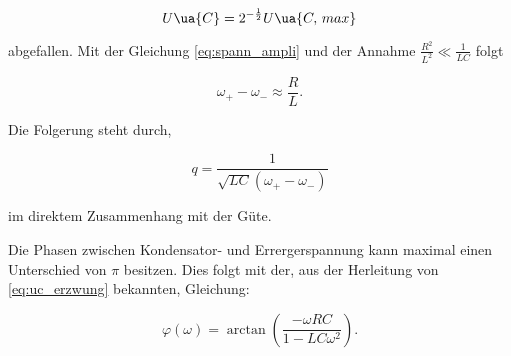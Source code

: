 \begin{equation*}
   U\ua{C}=2^{-\frac{1}{2}} U\ua{C,\, max}
\end{equation*}

abgefallen.
Mit der Gleichung \eqref{eq:spann_ampli} und der Annahme $\frac{R^2}{L^2}\ll \frac{1}{LC}$
folgt

\begin{equation}
  \label{eq:omega_+_-}
  \omega_+-\omega_-\approx \frac{R}{L}.
\end{equation}

Die Folgerung steht durch,

\begin{equation*}
  q=\frac{1}{\sqrt{LC}\left(\omega_+-\omega_-\right)}
\end{equation*}

im direktem Zusammenhang mit der Güte.

Die Phasen zwischen Kondensator- und Errergerspannung kann maximal
einen Unterschied von $\pi$ besitzen. Dies folgt mit der, aus der
Herleitung von \eqref{eq:uc_erzwung} bekannten, Gleichung:

\begin{equation}
  \label{eq:phase}
  \varphi(\omega)=\arctan\left(\frac{-\omega RC}{1-LC\omega^2}\right).
\end{equation}
